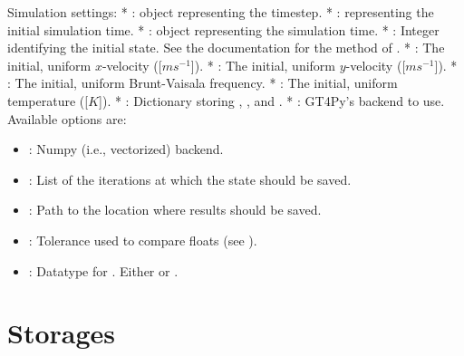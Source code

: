 \documentclass[letterpaper,10pt,english]{sphinxmanual}
\begin{document}
Simulation settings:
* :  object representing the timestep.
* :  representing the initial simulation time.
* :  object representing the simulation time.
* : Integer identifying the initial state. See the documentation for the method       of .
* : The initial, uniform \(x\)-velocity ({[}\(m s^{-1}\){]}).
* : The initial, uniform \(y\)-velocity ({[}\(m s^{-1}\){]}).
* : The initial, uniform Brunt-Vaisala frequency.
* : The initial, uniform temperature ({[}\(K\){]}).
* : Dictionary storing , ,  and .
* : GT4Py’s backend to use. Available options are:
\begin{itemize}
\item {} 
: Numpy (i.e., vectorized) backend.

\end{itemize}
\begin{itemize}
\item {} 
: List of the iterations at which the state should be saved.

\item {} 
: Path to the location where results should be saved.

\item {} 
: Tolerance used to compare floats (see {\hyperref[\detokenize{api:module-utils}]{}}).

\item {} 
: Datatype for . Either      or .

\end{itemize}


\section{Storages}
\label{\detokenize{api:storages}}
\end{document}
